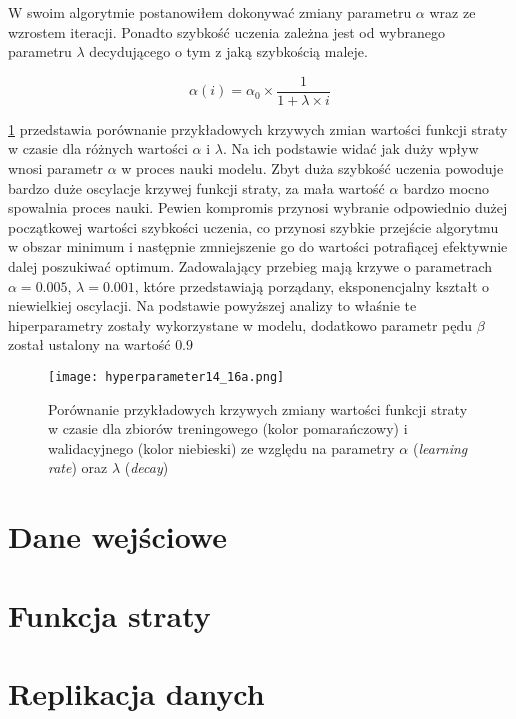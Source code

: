 \documentclass[]{article}
\theoremstyle{definition}
\begin{document}
W swoim algorytmie postanowiłem dokonywać zmiany parametru $\alpha$ wraz ze wzrostem iteracji. Ponadto szybkość uczenia zależna jest od wybranego parametru $\lambda$ decydującego o tym z jaką szybkością maleje.

\begin{equation}
\alpha(i) = \alpha_0 \times \frac{1}{1 + \lambda \times i}
\end{equation}

\figurename{} \ref{fig:hyperparameters} przedstawia porównanie przykładowych krzywych zmian wartości funkcji straty w czasie dla różnych wartości $\alpha$ i $\lambda$. Na ich podstawie widać jak duży wpływ wnosi parametr $\alpha$ w proces nauki modelu. Zbyt duża szybkość uczenia powoduje bardzo duże oscylacje krzywej funkcji straty, za mała wartość $\alpha$ bardzo mocno spowalnia proces nauki. Pewien kompromis przynosi wybranie odpowiednio dużej początkowej wartości szybkości uczenia, co przynosi szybkie przejście algorytmu w obszar minimum i następnie zmniejszenie go do wartości potrafiącej efektywnie dalej poszukiwać optimum. Zadowalający przebieg mają krzywe o parametrach $\alpha = 0.005$, $\lambda = 0.001$, które przedstawiają porządany, eksponencjalny kształt o niewielkiej oscylacji. Na podstawie powyższej analizy to właśnie te hiperparametry zostały wykorzystane w modelu, dodatkowo parametr pędu $\beta$ został ustalony na wartość $0.9$


\begin{figure}[htp!]
	\centering
	\texttt{[image: hyperparameter14\_16a.png]}
	\caption{Porównanie przykładowych krzywych zmiany wartości funkcji straty w czasie dla zbiorów treningowego (kolor pomarańczowy) i walidacyjnego (kolor niebieski) ze względu na parametry $\alpha$ (\textit{learning rate}) oraz $\lambda$ (\textit{decay})}
	\label{fig:hyperparameters}
\end{figure}


\section{Dane wejściowe}

\section{Funkcja straty}

\section{Replikacja danych}
\end{document}
